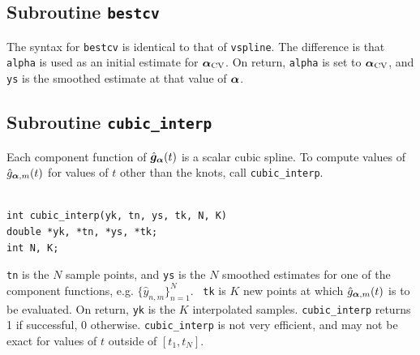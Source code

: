 \subsection{Subroutine {\tt bestcv}}

The syntax for {\tt bestcv} is identical to that of {\tt vspline}.
The difference is that
{\tt alpha} is used as an initial estimate for
$\bm{\alpha}_{{\rm CV}}$.
On return,
{\tt alpha} is set to $\bm{\alpha}_{{\rm CV}}$,
and {\tt ys}
is the smoothed estimate at that value of $\bm{\alpha}$.

\subsection{Subroutine {\tt cubic\_interp}}

Each component function of
$\hat{\bm{g}}_{\bm{\alpha}}(t)$
is a scalar cubic spline.
To compute values of
$\hat{g}_{\bm{\alpha},m}(t)$
for values of $t$ other than the knots,
call 
{\tt cubic\_interp}.

\begin{verbatim}

int cubic_interp(yk, tn, ys, tk, N, K)
double *yk, *tn, *ys, *tk;
int N, K;

\end{verbatim}

{\tt tn} is the $N$ sample points,
and {\tt ys} is the $N$ smoothed estimates
for one of the component functions,
e.g.
$\{\hat{y}_{n,m}\}_{n=1}^N$. \
{\tt tk} is $K$ new points at which
$\hat{g}_{\bm{\alpha},m}(t)$
is to be evaluated.
On return,
{\tt yk} is the $K$ interpolated samples.
{\tt cubic\_interp} returns 1 if successful, 0 otherwise.
{\tt cubic\_interp} is not very efficient,
and may not be exact for values of $t$
outside of $[t_1,t_N]$.
